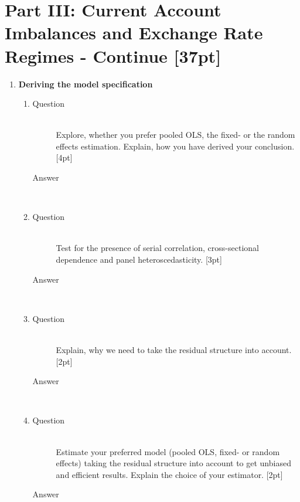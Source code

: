 \documentclass{article}
\begin{document}
\section{Part III: Current Account Imbalances and Exchange Rate Regimes - Continue [37pt]}

\begin{enumerate}
  \item \textbf{Deriving the model specification}
  \begin{enumerate}[label=(\alph*)]
    \item 
    \begin{description}
      \item[Question] \hfill \\
      Explore, whether you prefer pooled OLS, the fixed- or the random effects estimation. Explain, how you have derived your conclusion. [4pt]
      \item[Answer] \hfill \\
    \end{description}
    \item 
    \begin{description}
      \item[Question] \hfill \\
      Test for the presence of serial correlation, cross-sectional dependence and panel heteroscedasticity. [3pt]
      \item[Answer] \hfill \\
    \end{description}
    \item 
    \begin{description}
      \item[Question] \hfill \\
      Explain, why we need to take the residual structure into account. [2pt]
      \item[Answer] \hfill \\
    \end{description}
    \item 
    \begin{description}
      \item[Question] \hfill \\
      Estimate your preferred model (pooled OLS, fixed- or random effects) taking the residual structure into account to get unbiased and efficient results. Explain the choice of your estimator. [2pt]
      \item[Answer] \hfill \\
    \end{description}

\end{enumerate}
\end{enumerate}
\end{document}
